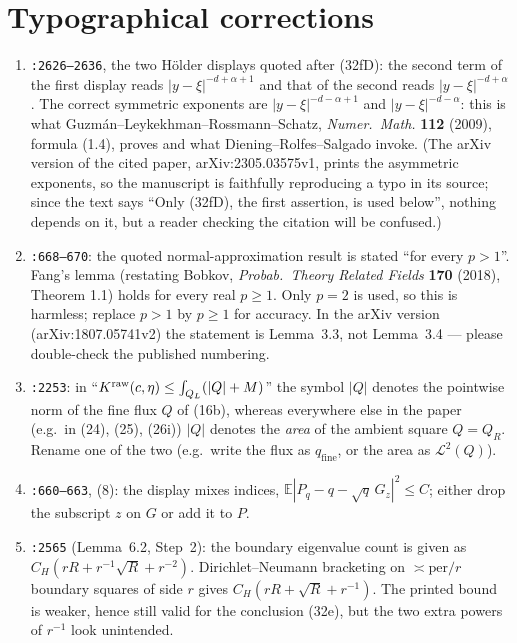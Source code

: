 \documentclass[11pt]{article}
\newcommand{\E}{\mathbb{E}}
\begin{document}
\section*{Typographical corrections}
\begin{enumerate}[label=T\arabic*., leftmargin=2.6em, itemsep=2pt]
  \item \texttt{:2626--2636}, the two H\"older displays quoted after (32fD): the second term of the
  first display reads $|y-\xi|^{-d+\alpha+1}$ and that of the second reads
  $|y-\xi|^{-d+\alpha}$. The correct symmetric exponents are
  $|y-\xi|^{-d-\alpha+1}$ and $|y-\xi|^{-d-\alpha}$: this is what
  Guzm\'an--Leykekhman--Rossmann--Schatz, \emph{Numer.\ Math.} \textbf{112} (2009), formula
  (1.4), proves and what Diening--Rolfes--Salgado invoke. (The arXiv version of the cited paper,
  arXiv:2305.03575v1, prints the asymmetric exponents, so the manuscript is faithfully
  reproducing a typo in its source; since the text says ``Only (32fD), the first assertion, is
  used below'', nothing depends on it, but a reader checking the citation will be confused.)
  \item \texttt{:668--670}: the quoted normal-approximation result is stated ``for every
  $p>1$''. Fang's lemma (restating Bobkov, \emph{Probab.\ Theory Related Fields} \textbf{170}
  (2018), Theorem 1.1) holds for every real $p\ge1$. Only $p=2$ is used, so this is harmless;
  replace $p>1$ by $p\ge1$ for accuracy. In the arXiv version (arXiv:1807.05741v2) the
  statement is Lemma~3.3, not Lemma~3.4 --- please double-check the published numbering.
  \item \texttt{:2253}: in ``$K^{\rm raw}(c,\eta)\le\int_{Q_L}(|Q|+M)$'' the symbol $|Q|$ denotes
  the pointwise norm of the fine flux $Q$ of (16b), whereas everywhere else in the paper (e.g.\
  in (24), (25), (26i)) $|Q|$ denotes the \emph{area} of the ambient square $Q=Q_R$. Rename one
  of the two (e.g.\ write the flux as $q_{\mathrm{fine}}$, or the area as $\mathcal L^2(Q)$).
  \item \texttt{:660--663}, (8): the display mixes indices, $\E|P_q-q-\sqrt q\,G_z|^2\le C$; either
  drop the subscript $z$ on $G$ or add it to $P$.
  \item \texttt{:2565} (Lemma~6.2, Step~2): the boundary eigenvalue count is given as
  $C_H(rR+r^{-1}\sqrt R+r^{-2})$. Dirichlet--Neumann bracketing on $\asymp \mathrm{per}/r$
  boundary squares of side $r$ gives $C_H(rR+\sqrt R+r^{-1})$. The printed bound is weaker,
  hence still valid for the conclusion (32e), but the two extra powers of $r^{-1}$ look
  unintended.
\end{enumerate}
\end{document}
